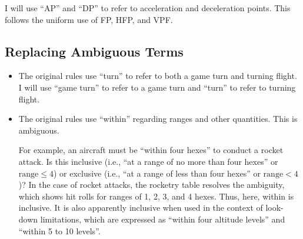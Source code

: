 \documentclass[10pt]{article}
\begin{document}
I will use “AP” and “DP” to refer to acceleration and deceleration points. This follows the uniform use of FP, HFP, and VPF.

\subsection{Replacing Ambiguous Terms}

\begin{itemize}
    \item {} The original rules use “turn” to refer to both a game turn and turning flight. I will use “game turn” to refer to a game turn and “turn” to refer to turning flight.

    \item {} The original rules use “within” regarding ranges and other quantities. This is ambiguous. 
    
    For example, an aircraft must be “within four hexes” to conduct a rocket attack. Is this inclusive (i.e., “at a range of no more than four hexes” or $\textrm{range}\le4$) or exclusive (i.e., “at a range of less than four hexes” or $\textrm{range}<4$)? In the case of rocket attacks, the rocketry table resolves the ambiguity, which shows hit rolls for ranges of 1, 2, 3, and 4 hexes. Thus, here, within is inclusive. It is also apparently inclusive when used in the context of look-down limitations, which are expressed as “within four altitude levels” and “within 5 to 10 levels”.


\end{itemize}
\end{document}
